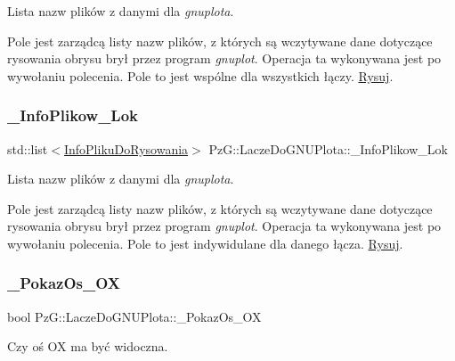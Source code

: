 Lista nazw plików z danymi dla {\itshape gnuplota}. 

Pole jest zarządcą listy nazw plików, z których są wczytywane dane dotyczące rysowania obrysu brył przez program {\itshape gnuplot}. Operacja ta wykonywana jest po wywołaniu polecenia. Pole to jest wspólne dla wszystkich łączy. \mbox{\hyperlink{class_pz_g_1_1_lacze_do_g_n_u_plota_a065f5b8402737cc62b0ad4f66d028335}{Rysuj}}. \mbox{\label{class_pz_g_1_1_lacze_do_g_n_u_plota_abb57c6afa7e391036b0ad9ef3e454913}} 
\subsubsection{\texorpdfstring{\_InfoPlikow\_Lok}{\_InfoPlikow\_Lok}}
{\footnotesize\ttfamily std\+::list$<$\mbox{\hyperlink{class_pz_g_1_1_info_pliku_do_rysowania}{Info\+Pliku\+Do\+Rysowania}}$>$ Pz\+G\+::\+Lacze\+Do\+G\+N\+U\+Plota\+::\+\_\+\+Info\+Plikow\+\_\+\+Lok\hspace{0.3cm}{\ttfamily [protected]}}



Lista nazw plików z danymi dla {\itshape gnuplota}. 

Pole jest zarządcą listy nazw plików, z których są wczytywane dane dotyczące rysowania obrysu brył przez program {\itshape gnuplot}. Operacja ta wykonywana jest po wywołaniu polecenia. Pole to jest indywidulane dla danego łącza. \mbox{\hyperlink{class_pz_g_1_1_lacze_do_g_n_u_plota_a065f5b8402737cc62b0ad4f66d028335}{Rysuj}}. \mbox{\label{class_pz_g_1_1_lacze_do_g_n_u_plota_a833aa8994b9913786f920ec8c259731f}} 
\subsubsection{\texorpdfstring{\_PokazOs\_OX}{\_PokazOs\_OX}}
{\footnotesize\ttfamily bool Pz\+G\+::\+Lacze\+Do\+G\+N\+U\+Plota\+::\+\_\+\+Pokaz\+Os\+\_\+\+OX\hspace{0.3cm}{\ttfamily [protected]}}



Czy oś OX ma być widoczna. 

